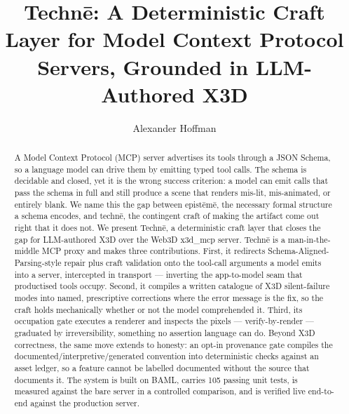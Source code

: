 \documentclass[sigconf,nonacm,screen,anonymous]{acmart}
\begin{document}
\title{Technē: A Deterministic Craft Layer for Model Context Protocol Servers, Grounded in LLM-Authored X3D}

\author{Alexander Hoffman}


\begin{abstract}
A Model Context Protocol (MCP) server advertises its tools through a JSON Schema, so a language model can drive them by emitting typed tool calls. The schema is decidable and closed, yet it is the wrong success criterion: a model can emit calls that pass the schema in full and still produce a scene that renders mis-lit, mis-animated, or entirely blank. We name this the gap between epistēmē, the necessary formal structure a schema encodes, and technē, the contingent craft of making the artifact come out right that it does not. We present Technē, a deterministic craft layer that closes the gap for LLM-authored X3D over the Web3D x3d\_mcp server. Technē is a man-in-the-middle MCP proxy and makes three contributions. First, it redirects Schema-Aligned-Parsing-style repair plus craft validation onto the tool-call arguments a model emits into a server, intercepted in transport — inverting the app-to-model seam that productised tools occupy. Second, it compiles a written catalogue of X3D silent-failure modes into named, prescriptive corrections where the error message is the fix, so the craft holds mechanically whether or not the model comprehended it. Third, its occupation gate executes a renderer and inspects the pixels — verify-by-render — graduated by irreversibility, something no assertion language can do. Beyond X3D correctness, the same move extends to honesty: an opt-in provenance gate compiles the documented/interpretive/generated convention into deterministic checks against an asset ledger, so a feature cannot be labelled documented without the source that documents it. The system is built on BAML, carries 105 passing unit tests, is measured against the bare server in a controlled comparison, and is verified live end-to-end against the production server.
\end{abstract}

\end{document}
